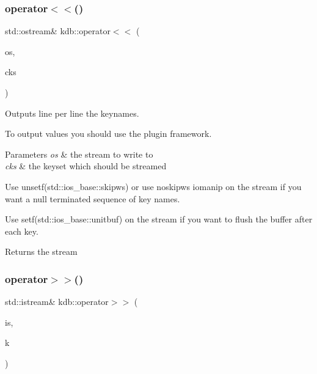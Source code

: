 \subsubsection{\texorpdfstring{operator$<$$<$()}{operator<<()}\hspace{0.1cm}{\footnotesize\ttfamily [2/2]}}
{\footnotesize\ttfamily std\+::ostream\& kdb\+::operator$<$$<$ (\begin{DoxyParamCaption}\item[{std\+::ostream \&}]{os,  }\item[{\hyperlink{classkdb_1_1KeySet}{kdb\+::\+Key\+Set} const \&}]{cks }\end{DoxyParamCaption})\hspace{0.3cm}{\ttfamily [inline]}}



Outputs line per line the keynames. 

To output values you should use the plugin framework.


\begin{DoxyParams}{Parameters}
{\em os} & the stream to write to \\
\hline
{\em cks} & the keyset which should be streamed\\
\hline
\end{DoxyParams}
Use unsetf(std\+::ios\+\_\+base\+::skipws) or use noskipws iomanip on the stream if you want a null terminated sequence of key names.

Use setf(std\+::ios\+\_\+base\+::unitbuf) on the stream if you want to flush the buffer after each key.

\begin{DoxyReturn}{Returns}
the stream 
\end{DoxyReturn}
\mbox{\label{namespacekdb_a66342865d6cdbb19075f52d92e7a61b1}} 
\subsubsection{\texorpdfstring{operator$>$$>$()}{operator>>()}\hspace{0.1cm}{\footnotesize\ttfamily [1/2]}}
{\footnotesize\ttfamily std\+::istream\& kdb\+::operator$>$$>$ (\begin{DoxyParamCaption}\item[{std\+::istream \&}]{is,  }\item[{\hyperlink{classkdb_1_1Key}{kdb\+::\+Key} \&}]{k }\end{DoxyParamCaption})\hspace{0.3cm}{\ttfamily [inline]}}



